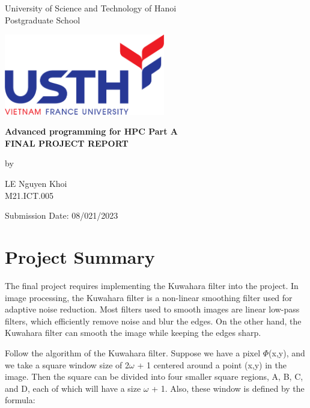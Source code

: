 \documentclass{article}
\begin{document}
\begin{center}
    \thispagestyle{empty}
    \LARGE{University of Science and Technology of Hanoi}\\[-0.9ex]
    \LARGE{Postgraduate School}
    \vspace{0.5cm}
    \begin{center}
        \includegraphics[width=7cm]{images/2020.png}\\
        \vspace{0.4cm}
        \medskip\par
        \textbf{\Large{Advanced programming for HPC Part A}}\\
        \vspace{1.2cm}
        \Large{\textbf{FINAL PROJECT REPORT}}\\[-0.5ex]
        \bigskip\par
        by \par
        \large{LE Nguyen Khoi}\\[-1ex]
        \large{M21.ICT.005}\\ [-1ex]
        \vspace{7cm}
    \end{center}
    \medskip
\end{center}
\begin{center}
  Submission Date:  08/021/2023\\[-1ex]
\end{center}
\pagebreak
{}
\section{Project Summary}
The final project requires implementing the Kuwahara filter into the project. In image processing, the Kuwahara filter is a non-linear smoothing filter used for adaptive noise reduction. Most filters used to smooth images are linear low-pass filters, which efficiently remove noise and blur the edges. On the other hand, the Kuwahara filter can smooth the image while keeping the edges sharp. 

Follow the algorithm of the Kuwahara filter. Suppose we have a pixel $\Phi$(x,y), and we take a square window size of 2$\omega$ + 1 centered around a point (x,y) in the image. Then the square can be divided into four smaller square regions, A, B, C, and D, each of which will have a size $\omega$ + 1. Also, these window is defined by the formula: 
\end{document}
